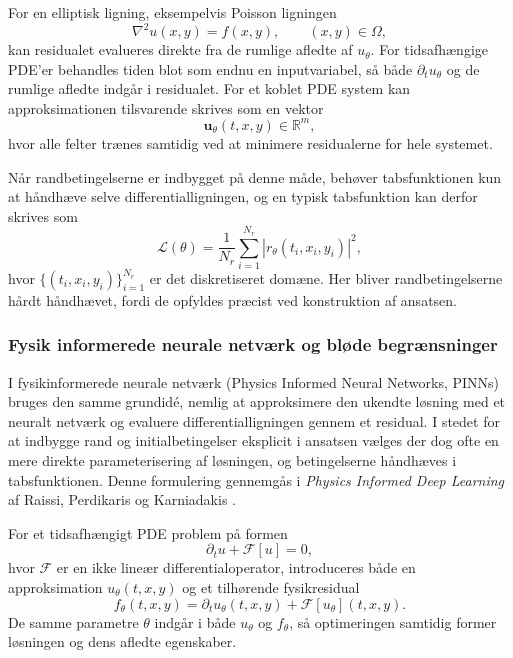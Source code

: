 For en elliptisk ligning, eksempelvis Poisson ligningen
\[
    \nabla^2 u(x,y) = f(x,y),
    \qquad
    (x,y)\in\Omega,
\]
kan residualet evalueres direkte fra de rumlige afledte af $u_\theta$. For tidsafhængige PDE'er behandles tiden blot som endnu en inputvariabel, så både $\partial_t u_\theta$ og de rumlige afledte indgår i residualet. For et koblet PDE system kan approksimationen tilsvarende skrives som en vektor
\[
    \mathbf{u}_\theta(t,x,y)\in\mathbb{R}^m,
\]
hvor alle felter trænes samtidig ved at minimere residualerne for hele systemet.

Når randbetingelserne er indbygget på denne måde, behøver tabsfunktionen kun at håndhæve selve differentialligningen, og en typisk tabsfunktion kan derfor skrives som
\begin{equation}
    \mathcal{L}(\theta)
    =
    \frac{1}{N_r}\sum_{i=1}^{N_r}
    \left|r_\theta(t_i,x_i,y_i)\right|^2,
    \label{eq:pinn_loss}
\end{equation}
hvor $\{(t_i,x_i,y_i)\}_{i=1}^{N_r}$ er det diskretiseret domæne. Her bliver randbetingelserne hårdt håndhævet, fordi de opfyldes præcist ved konstruktion af ansatsen.

\subsubsection{Fysik informerede neurale netværk og bløde begrænsninger}
I fysikinformerede neurale netværk (Physics Informed Neural Networks, PINNs) bruges den samme grundidé, nemlig at approksimere den ukendte løsning med et neuralt netværk og evaluere differentialligningen gennem et residual. I stedet for at indbygge rand og initialbetingelser eksplicit i ansatsen vælges der dog ofte en mere direkte parameterisering af løsningen, og betingelserne håndhæves i tabsfunktionen. Denne formulering gennemgås i \textit{Physics Informed Deep Learning} af Raissi, Perdikaris og Karniadakis \cite{raissi2017pinn_part1}.

For et tidsafhængigt PDE problem på formen
\begin{equation}
    \partial_t u + \mathcal{F}[u] = 0,
    \label{eq:raissi_general_pde}
\end{equation}
hvor $\mathcal{F}$ er en ikke lineær differentialoperator, introduceres både en approksimation $u_\theta(t,x,y)$ og et tilhørende fysikresidual
\begin{equation}
    f_\theta(t,x,y)
    =
    \partial_t u_\theta(t,x,y) + \mathcal{F}[u_\theta](t,x,y).
    \label{eq:pinn_physics_residual}
\end{equation}
De samme parametre $\theta$ indgår i både $u_\theta$ og $f_\theta$, så optimeringen samtidig former løsningen og dens afledte egenskaber.

